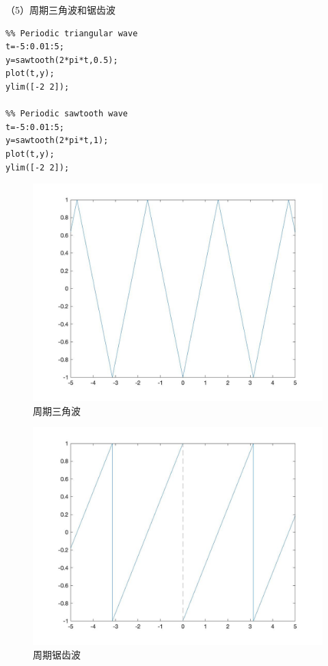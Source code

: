 \documentclass[a4paper,12pt]{ctexart}
\begin{document}
（5）周期三角波和锯齿波
\begin{lstlisting}
%% Periodic triangular wave
t=-5:0.01:5;
y=sawtooth(2*pi*t,0.5);
plot(t,y);
ylim([-2 2]);

%% Periodic sawtooth wave
t=-5:0.01:5;
y=sawtooth(2*pi*t,1);
plot(t,y);
ylim([-2 2]);
\end{lstlisting}
\begin{figure}[H]
    \centering
    \includegraphics[width=14cm]{5.jpg}
    \caption{周期三角波}
\end{figure}
\begin{figure}[H]
    \centering
    \includegraphics[width=14cm]{6.jpg}
    \caption{周期锯齿波}
\end{figure}
\end{document}
